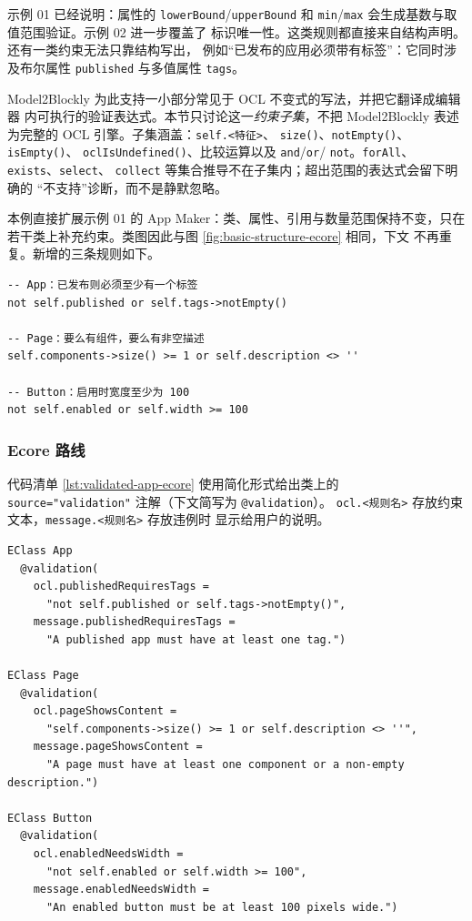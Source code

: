 示例 01 已经说明：属性的 \texttt{lowerBound}/\texttt{upperBound} 和
\texttt{min}/\texttt{max} 会生成基数与取值范围验证。示例 02 进一步覆盖了
标识唯一性。这类规则都直接来自结构声明。还有一类约束无法只靠结构写出，
例如“已发布的应用必须带有标签”：它同时涉及布尔属性 \texttt{published}
与多值属性 \texttt{tags}。

Model2Blockly 为此支持一小部分常见于 OCL 不变式的写法，并把它翻译成编辑器
内可执行的验证表达式。本节只讨论这一\emph{约束子集}，不把 Model2Blockly
表述为完整的 OCL 引擎。子集涵盖：\texttt{self.<特征>}、
\texttt{size()}、\texttt{notEmpty()}、\texttt{isEmpty()}、
\texttt{oclIsUndefined()}、比较运算以及 \texttt{and}/\texttt{or}/
\texttt{not}。\texttt{forAll}、\texttt{exists}、\texttt{select}、
\texttt{collect} 等集合推导不在子集内；超出范围的表达式会留下明确的
“不支持”诊断，而不是静默忽略。

本例直接扩展示例 01 的 App Maker：类、属性、引用与数量范围保持不变，只在
若干类上补充约束。类图因此与图 \ref{fig:basic-structure-ecore} 相同，下文
不再重复。新增的三条规则如下。

\begin{lstlisting}[style=tfmcode, captionpos=t,
caption={第四个示例新增的约束子集规则},
label={lst:validated-app-rules}]
-- App：已发布则必须至少有一个标签
not self.published or self.tags->notEmpty()

-- Page：要么有组件，要么有非空描述
self.components->size() >= 1 or self.description <> ''

-- Button：启用时宽度至少为 100
not self.enabled or self.width >= 100
\end{lstlisting}

\subsubsection{Ecore 路线}

代码清单 \ref{lst:validated-app-ecore} 使用简化形式给出类上的
\texttt{source="validation"} 注解（下文简写为 \texttt{@validation}）。
\texttt{ocl.<规则名>} 存放约束文本，\texttt{message.<规则名>} 存放违例时
显示给用户的说明。

\begin{lstlisting}[style=tfmcode, captionpos=t,
caption={新增约束的 Ecore 注解简化表示},
label={lst:validated-app-ecore}]
EClass App
  @validation(
    ocl.publishedRequiresTags =
      "not self.published or self.tags->notEmpty()",
    message.publishedRequiresTags =
      "A published app must have at least one tag.")

EClass Page
  @validation(
    ocl.pageShowsContent =
      "self.components->size() >= 1 or self.description <> ''",
    message.pageShowsContent =
      "A page must have at least one component or a non-empty description.")

EClass Button
  @validation(
    ocl.enabledNeedsWidth =
      "not self.enabled or self.width >= 100",
    message.enabledNeedsWidth =
      "An enabled button must be at least 100 pixels wide.")
\end{lstlisting}

